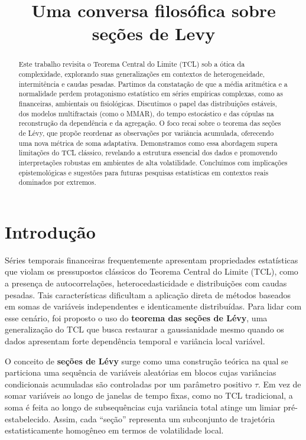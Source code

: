 \documentclass[
  portuguese,
]{agujournal2019}
\begin{document}
\title{Uma conversa filosófica sobre seções de Levy}



\begin{abstract}
Este trabalho revisita o Teorema Central do Limite (TCL) sob a ótica da
complexidade, explorando suas generalizações em contextos de
heterogeneidade, intermitência e caudas pesadas. Partimos da constatação
de que a média aritmética e a normalidade perdem protagonismo
estatístico em séries empíricas complexas, como as financeiras,
ambientais ou fisiológicas. Discutimos o papel das distribuições
estáveis, dos modelos multifractais (como o MMAR), do tempo estocástico
e das cópulas na reconstrução da dependência e da agregação. O foco
recai sobre o teorema das seções de Lévy, que propõe reordenar as
observações por variância acumulada, oferecendo uma nova métrica de soma
adaptativa. Demonstramos como essa abordagem supera limitações do TCL
clássico, revelando a estrutura essencial dos dados e promovendo
interpretações robustas em ambientes de alta volatilidade. Concluímos
com implicações epistemológicas e sugestões para futuras pesquisas
estatísticas em contextos reais dominados por extremos.
\end{abstract}





\section{Introdução}\label{introduuxe7uxe3o}

Séries temporais financeiras frequentemente apresentam propriedades
estatísticas que violam os pressupostos clássicos do Teorema Central do
Limite (TCL), como a presença de autocorrelações, heterocedasticidade e
distribuições com caudas pesadas. Tais características dificultam a
aplicação direta de métodos baseados em somas de variáveis independentes
e identicamente distribuídas. Para lidar com esse cenário, foi proposto
o uso do \textbf{teorema das seções de Lévy}, uma generalização do TCL
que busca restaurar a gaussianidade mesmo quando os dados apresentam
forte dependência temporal e variância local variável.

O conceito de \textbf{seções de Lévy} surge como uma construção teórica
na qual se particiona uma sequência de variáveis aleatórias em blocos
cujas variâncias condicionais acumuladas são controladas por um
parâmetro positivo \(\tau\). Em vez de somar variáveis ao longo de
janelas de tempo fixas, como no TCL tradicional, a soma é feita ao longo
de subsequências cuja variância total atinge um limiar pré-estabelecido.
Assim, cada ``seção'' representa um subconjunto de trajetória
estatisticamente homogêneo em termos de volatilidade local.
\end{document}
